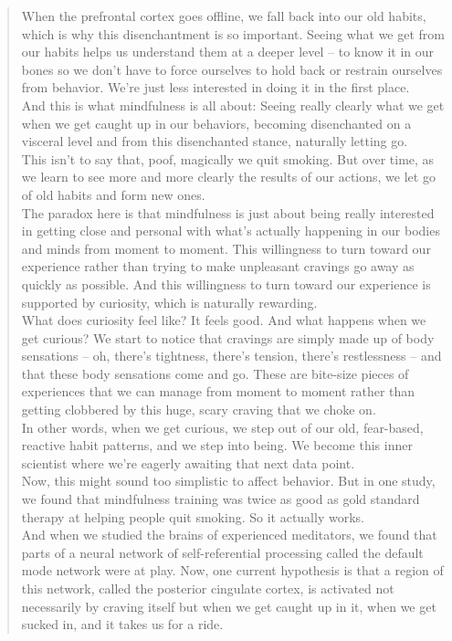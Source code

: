 \documentclass[a4paper,dottedtoc,headinclude,footinclude]{report} %
\theoremstyle{plain}
\begin{document}
\begin{quote}
    When the prefrontal cortex goes offline, we fall back into our old habits, which is why this disenchantment is so important. Seeing what we get from our habits helps us understand them at a deeper level -- to know it in our bones so we don't have to force ourselves to hold back or restrain ourselves from behavior. We're just less interested in doing it in the first place.\\
    And this is what mindfulness is all about: Seeing really clearly what we get when we get caught up in our behaviors, becoming disenchanted on a visceral level and from this disenchanted stance, naturally letting go.\\
    This isn't to say that, poof, magically we quit smoking. But over time, as we learn to see more and more clearly the results of our actions, we let go of old habits and form new ones.\\
    The paradox here is that mindfulness is just about being really interested in getting close and personal with what's actually happening in our bodies and minds from moment to moment. This willingness to turn toward our experience rather than trying to make unpleasant cravings go away as quickly as possible. And this willingness to turn toward our experience is supported by curiosity, which is naturally rewarding.\\
    What does curiosity feel like? It feels good. And what happens when we get curious? We start to notice that cravings are simply made up of body sensations -- oh, there's tightness, there's tension, there's restlessness -- and that these body sensations come and go. These are bite-size pieces of experiences that we can manage from moment to moment rather than getting clobbered by this huge, scary craving that we choke on.\\
    In other words, when we get curious, we step out of our old, fear-based, reactive habit patterns, and we step into being. We become this inner scientist where we're eagerly awaiting that next data point.\\
    Now, this might sound too simplistic to affect behavior. But in one study, we found that mindfulness training was twice as good as gold standard therapy at helping people quit smoking. So it actually works.\\
    And when we studied the brains of experienced meditators, we found that parts of a neural network of self-referential processing called the default mode network were at play. Now, one current hypothesis is that a region of this network, called the posterior cingulate cortex, is activated not necessarily by craving itself but when we get caught up in it, when we get sucked in, and it takes us for a ride.\\

\end{quote}
\end{document}
